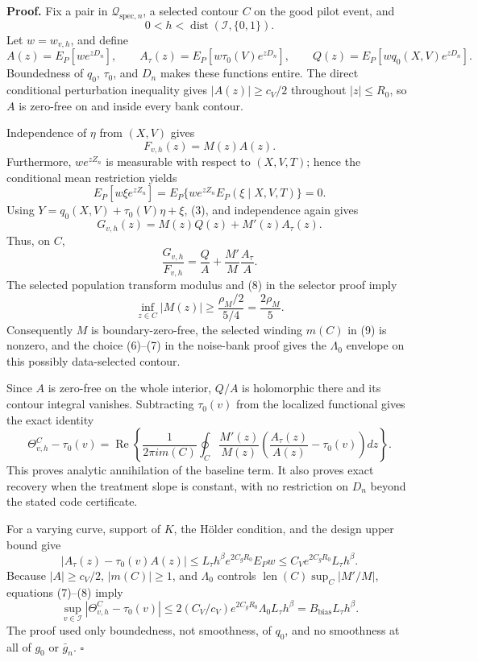 \textbf{Proof.}
Fix a pair in \(\mathcal Q_{\mathrm{spec},n}\), a selected contour \(C\) on the good pilot event, and
\[
 0<h<\operatorname{dist}(\mathcal I,\{0,1\}).
\]
Let \(w=w_{v,h}\), and define
\[
 A(z)=E_P[we^{zD_n}],\qquad
 A_\tau(z)=E_P[w\tau_0(V)e^{zD_n}],\qquad
 Q(z)=E_P[wq_0(X,V)e^{zD_n}]. \tag{1}
\]
Boundedness of \(q_0\), \(\tau_0\), and \(D_n\) makes these functions entire.  The direct conditional perturbation inequality gives \(|A(z)|\ge c_V/2\) throughout \(|z|\le R_0\), so \(A\) is zero-free on and inside every bank contour.

Independence of \(\eta\) from \((X,V)\) gives
\[
 F_{v,h}(z)=M(z)A(z). \tag{2}
\]
Furthermore, \(we^{zZ_n}\) is measurable with respect to \((X,V,T)\); hence the conditional mean restriction yields
\[
 E_P[w\xi e^{zZ_n}]
 =E_P\{we^{zZ_n}E_P(\xi\mid X,V,T)\}=0. \tag{3}
\]
Using \(Y=q_0(X,V)+\tau_0(V)\eta+\xi\), (3), and independence again gives
\[
 G_{v,h}(z)=M(z)Q(z)+M'(z)A_\tau(z). \tag{4}
\]
Thus, on \(C\),
\[
 \frac{G_{v,h}}{F_{v,h}}
 =\frac{Q}{A}+\frac{M'}{M}\frac{A_\tau}{A}. \tag{5}
\]
The selected population transform modulus and (8) in the selector proof imply
\[
 \inf_{z\in C}|M(z)|\ge
 \frac{\rho_M/2}{5/4}=\frac{2\rho_M}{5}. \tag{6}
\]
Consequently \(M\) is boundary-zero-free, the selected winding \(m(C)\) in (9) is nonzero, and the choice (6)--(7) in the noise-bank proof gives the \(\Lambda_0\) envelope on this possibly data-selected contour.

Since \(A\) is zero-free on the whole interior, \(Q/A\) is holomorphic there and its contour integral vanishes.  Subtracting \(\tau_0(v)\) from the localized functional gives the exact identity
\[
 \Theta^C_{v,h}-\tau_0(v)
 =\operatorname{Re}\left\{
 \frac{1}{2\pi i m(C)}\oint_C\frac{M'(z)}{M(z)}
 \left(\frac{A_\tau(z)}{A(z)}-\tau_0(v)\right)dz
 \right\}. \tag{7}
\]
This proves analytic annihilation of the baseline term.  It also proves exact recovery when the treatment slope is constant, with no restriction on \(D_n\) beyond the stated code certificate.

For a varying curve, support of \(K\), the H\"older condition, and the design upper bound give
\[
 |A_\tau(z)-\tau_0(v)A(z)|
 \le L_\tau h^\beta e^{2C_gR_0}E_Pw
 \le C_Ve^{2C_gR_0}L_\tau h^\beta. \tag{8}
\]
Because \(|A|\ge c_V/2\), \(|m(C)|\ge1\), and \(\Lambda_0\) controls \(\operatorname{len}(C)\sup_C|M'/M|\), equations (7)--(8) imply
\[
 \sup_{v\in\mathcal I}|\Theta^C_{v,h}-\tau_0(v)|
 \le2(C_V/c_V)e^{2C_gR_0}\Lambda_0L_\tau h^\beta
 =B_{\mathrm{bias}}L_\tau h^\beta. \tag{9}
\]
The proof used only boundedness, not smoothness, of \(q_0\), and no smoothness at all of \(g_0\) or \(\bar g_n\). \(\square\)